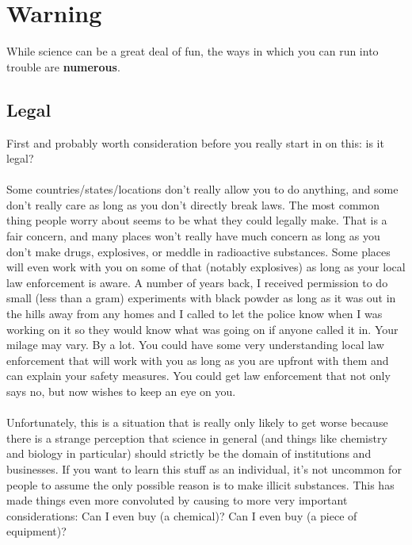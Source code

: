 \documentclass{book}
\begin{document}
\chapter{Warning}
While science can be a great deal of fun, the ways in which you can run into trouble are \textbf{numerous}.\\
\section{Legal}
First and probably worth consideration before you really start in on this: is it legal?\\
\\
Some countries/states/locations don't really allow you to do anything, and some don't really care as long as you don't directly break laws.  The most common thing people worry about seems to be what they could legally make.  That is a fair concern, and many places won't really have much concern as long as you don't make drugs, explosives, or meddle in radioactive substances.  Some places will even work with you on some of that (notably explosives) as long as your local law enforcement is aware.  A number of years back, I received permission to do small (less than a gram) experiments with black powder as long as it was out in the hills away from any homes and I called to let the police know when I was working on it so they would know what was going on if anyone called it in.  Your milage may vary.  By a lot.  You could have some very understanding local law enforcement that will work with you as long as you are upfront with them and can explain your safety measures.  You could get law enforcement that not only says no, but now wishes to keep an eye on you.\\
\\
Unfortunately, this is a situation that is really only likely to get worse because there is a strange perception that science in general (and things like chemistry and biology in particular) should strictly be the domain of institutions and businesses.  If you want to learn this stuff as an individual, it's not uncommon for people to assume the only possible reason is to make illicit substances.  This has made things even more convoluted by causing to more very important considerations:  Can I even buy (a chemical)?  Can I even buy (a piece of equipment)?\\
\\
\end{document}
